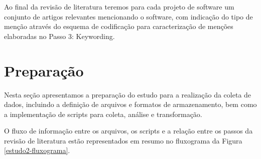 
Ao final da revisão de literatura teremos para cada projeto de software um
conjunto de artigos relevantes mencionando o software, com indicação do tipo de menção
através do esquema de codificação para caracterização de menções elaboradas no Passo 3: Keywording.





\section{Preparação} \label{estudo2:preparacao} %

Nesta seção apresentamos a preparação do estudo para a realização da coleta de
dados, incluindo a definição de arquivos e formatos de armazenamento, bem como
a implementação de scripts para coleta, análise e transformação.

O fluxo de informação entre os arquivos, os scripts e a relação entre os passos
da revisão de literatura estão representados em resumo no fluxograma da Figura
\ref{estudo2-fluxograma}.

